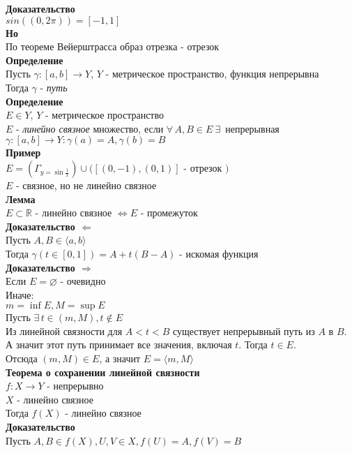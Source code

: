 \documentclass[12pt]{article}
\begin{document}
\textbf{Доказательство}\\
$sin((0, 2\pi)) = [-1, 1]$\\
\textbf{Но}\\
По теореме Вейерштрасса образ отрезка - отрезок\\
\textbf{Определение}\\
Пусть $\gamma:[a,b] \rightarrow Y$, $Y$ - метрическое пространство, функция непрерывна\\
Тогда $\gamma$ - \textit{путь}\\
\textbf{Определение}\\
$E \in Y$, $Y$ - метрическое пространство\\
$E$ - \textit{линейно связное} множество, если $\forall\,A,B \in E\ \exists\,$ непрерывная $\gamma:[a,b] \rightarrow Y: \gamma(a) = A,\gamma(b) = B$\\
\textbf{Пример}\\
$E = (\Gamma_{y=\sin \frac1x}) \cup ([(0,-1), (0,1)]$ - отрезок $)$\\
$E$ - связное, но не линейно связное\\
\textbf{Лемма}\\
$E\subset \mathbb{R}$ - линейно связное $\Leftrightarrow E$ - промежуток\\
\textbf{Доказательство $\Leftarrow$}\\
Пусть $A, B \in \langle a, b \rangle$\\
Тогда $\gamma(t \in [0, 1]) = A + t(B-A)$ - искомая функция\\
\textbf{Доказательство $\Rightarrow$}\\
Если $E = \varnothing$ - очевидно\\
Иначе:\\
$m = \inf E, M = \sup E$\\
Пусть $\exists\,t \in (m, M), t \notin E$\\
Из линейной связности для $A < t < B$ существует непрерывный путь из $A$ в $B$. А значит этот путь принимает все значения, включая $t$. Тогда $t \in E$.\\
Отсюда $(m, M) \in E$, а значит $E = \langle m, M \rangle$\\
\textbf{Теорема о сохранении линейной связности}\\
$f: X \rightarrow Y$ - непрерывно\\
$X$ - линейно связное\\
Тогда $f(X)$ - линейно связное\\
\textbf{Доказательство}\\
Пусть $A, B \in f(X), U, V \in X, f(U) = A, f(V) = B$\\
\end{document}
